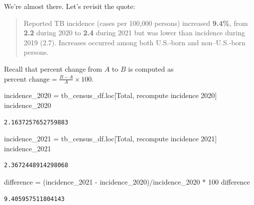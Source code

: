 \documentclass[
  letterpaper,
  DIV=11,
  numbers=noendperiod]{scrreprt}
\newenvironment{Shaded}{\begin{snugshade}}{\end{snugshade}}
\newcommand{\DecValTok}[1]{\textcolor[rgb]{0.68,0.00,0.00}{#1}}
\newcommand{\NormalTok}[1]{\textcolor[rgb]{0.00,0.23,0.31}{#1}}
\newcommand{\OperatorTok}[1]{\textcolor[rgb]{0.37,0.37,0.37}{#1}}
\newcommand{\StringTok}[1]{\textcolor[rgb]{0.13,0.47,0.30}{#1}}
\begin{document}
We're almost there. Let's revisit the quote:

\begin{quote}
Reported TB incidence (cases per 100,000 persons) increased
\textbf{9.4\%}, from \textbf{2.2} during 2020 to \textbf{2.4} during
2021 but was lower than incidence during 2019 (2.7). Increases occurred
among both U.S.-born and non--U.S.-born persons.
\end{quote}

Recall that percent change from \(A\) to \(B\) is computed as
\(\text{percent change} = \frac{B - A}{A} \times 100\).

\begin{Shaded}
\begin{Highlighting}[]
\NormalTok{incidence\_2020 }\OperatorTok{=}\NormalTok{ tb\_census\_df.loc[}\StringTok{\textquotesingle{}Total\textquotesingle{}}\NormalTok{, }\StringTok{\textquotesingle{}recompute incidence 2020\textquotesingle{}}\NormalTok{]}
\NormalTok{incidence\_2020}
\end{Highlighting}
\end{Shaded}

\begin{verbatim}
2.1637257652759883
\end{verbatim}

\begin{Shaded}
\begin{Highlighting}[]
\NormalTok{incidence\_2021 }\OperatorTok{=}\NormalTok{ tb\_census\_df.loc[}\StringTok{\textquotesingle{}Total\textquotesingle{}}\NormalTok{, }\StringTok{\textquotesingle{}recompute incidence 2021\textquotesingle{}}\NormalTok{]}
\NormalTok{incidence\_2021}
\end{Highlighting}
\end{Shaded}

\begin{verbatim}
2.3672448914298068
\end{verbatim}

\begin{Shaded}
\begin{Highlighting}[]
\NormalTok{difference }\OperatorTok{=}\NormalTok{ (incidence\_2021 }\OperatorTok{{-}}\NormalTok{ incidence\_2020)}\OperatorTok{/}\NormalTok{incidence\_2020 }\OperatorTok{*} \DecValTok{100}
\NormalTok{difference}
\end{Highlighting}
\end{Shaded}

\begin{verbatim}
9.405957511804143
\end{verbatim}
\end{document}
